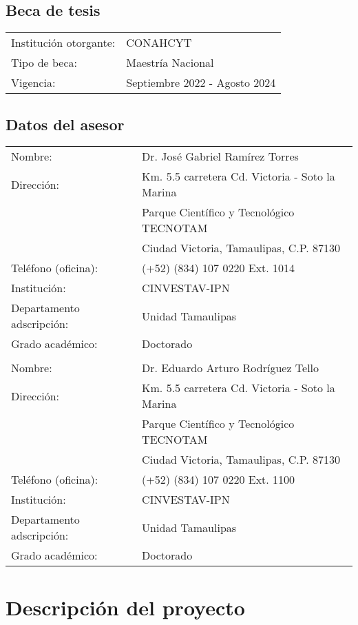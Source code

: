 \documentclass[11pt,epsf,times]{article}
\begin{document}
\subsection{Beca de tesis}
\begin{tabular}{ll} 
Instituci\'{o}n otorgante:  &  CONAHCYT  \\
Tipo de beca:      & Maestr\'ia Nacional\\
Vigencia:    &   Septiembre 2022 - Agosto 2024
\end{tabular}

\subsection{Datos del asesor}
\begin{tabular}{ll} 
Nombre:  &   Dr. José Gabriel Ramírez Torres \\
Direcci\'{o}n:   &   Km. 5.5 carretera Cd. Victoria - Soto la Marina\\
                 &  Parque Científico y Tecnológico TECNOTAM\\
                 &  Ciudad Victoria, Tamaulipas, C.P. 87130\\
Tel\'{e}fono (oficina):    &  (+52) (834) 107 0220 Ext. 1014 \\ 
Instituci\'{o}n:    &  CINVESTAV-IPN \\ 
Departamento adscripci\'{o}n: &  Unidad Tamaulipas\\
Grado acad\'{e}mico: & Doctorado \\\\
Nombre:  &   Dr. Eduardo Arturo Rodríguez Tello \\
Direcci\'{o}n:   &   Km. 5.5 carretera Cd. Victoria - Soto la Marina\\
                 &  Parque Científico y Tecnológico TECNOTAM\\
                 &  Ciudad Victoria, Tamaulipas, C.P. 87130\\
Tel\'{e}fono (oficina):    &  (+52) (834) 107 0220 Ext. 1100\\ 
Instituci\'{o}n:    &  CINVESTAV-IPN \\ 
Departamento adscripci\'{o}n: &  Unidad Tamaulipas\\
Grado acad\'{e}mico: & Doctorado 
\end{tabular} 

\newpage
\section{Descripci\'{o}n del proyecto}
\end{document}
